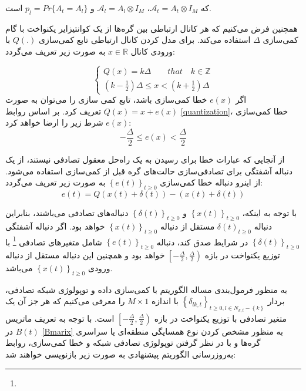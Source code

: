 که $\mathcal{A}_t=A_t\otimes I_M$، $\mathcal{A}_l=A_l\otimes I_M$ و  $p_l=Pr\{A_t=A_l\}$ است. 

همچنین فرض می‌کنیم که هر کانال ارتباطی بین گره‌ها از یک کوانتیزایر یکنواخت با گام کمی‌سازی $\Delta$ استفاده می‌کند. برای مدل کردن کانال ارتباطی تابع کمی‌سازی $Q(.)$ با ورودی کانال $x\in \mathbb{R}$ به صورت زیر تعریف می‌گردد:

\begin{equation}\label{quantization}
	\begin{cases}
		Q(x)=k\Delta\qquad that \quad k\in\mathbb{Z}\\
		(k-\frac{1}{2})\Delta\le x<	(k+\frac{1}{2})\Delta
	\end{cases}
\end{equation}
اگر $e(x)$ خطا کمی‌سازی باشد، تابع کمی سازی را می‌توان به صورت $Q(x)=x+e(x)$ تعریف کرد. بر اساس روابط \ref{quantization}، خطا کمی‌سازی $e(x)$ شرط زیر را ارضا خواهد کرد:
\begin{equation}
	-\frac{\Delta}{2}\le e(x)<\frac{\Delta}{2}
\end{equation}

از آنجایی که عبارات خطا برای رسیدن به یک راه‌حل معقول تصادفی نیستند، از یک دنباله آشفتگی برای تصادفی‌سازی حالت‌های گره قبل از کمی‌سازی استفاده می‌شود. از اینرو دنباله خطا کمی‌سازی $\left\{e(t)\right\}_{t\ge 0}$ به صورت زیر تعریف می‌گردد:
\begin{equation}
	e(t)=Q(x(t)+\delta(t))-(x(t)+\delta(t))
\end{equation}

با توجه به اینکه، $\left\{x(t)\right\}_{t\ge 0}$ و $\left\{\delta(t)\right\}_{t\ge 0}$ دنباله‌های تصادفی می‌باشند، بنابراین دنباله ${\delta(t)}_{t\ge 0}$ مستقل از دنباله $\left\{x(t)\right\}_{t\ge 0}$ خواهد بود. اگر دنباله آشفتگی $\left\{\delta(t)\right\}_{t\ge 0}$ در شرایط  \cite{SchuchmanCondition} صدق کند، دنباله $\left\{e(t)\right\}_{t\ge 0}$ شامل متغیرهای تصادفی  \footnote{} با توزیع یکنواخت در بازه
 $\left[-\frac{\Delta}{2},\frac{\Delta}{2}\right)$ خواهد بود و همچنین این دنباله مستقل از دنباله ورودی $\left\{x(t)\right\}_{t\ge 0}$ می‌باشد. 

به منظور فرمول‌بندی مساله الگوریتم  با کمی‌سازی داده و توپولوژی شبکه تصادفی، بردار $\left\{\delta_{lk,t}\right\}_{t\ge 0,l\in N_{k,t}{-}\left\{k\right\}}$ با اندازه $M\times 1$ را معرفی می‌کنیم که هر جز آن یک متغیر تصادفی  با توزیع یکنواخت در بازه $\left[-\frac{\Delta}{2},\frac{\Delta}{2}\right)$ است. با توجه به تعریف ماتریس $B(t)$ در \ref{Bmarix} به منظور مشخص کردن نوع همسایگی‌ منطقه‌ای یا سراسری گره‌ها و با در نظر گرفتن توپولوژی تصادفی شبکه و خطا کمی‌سازی، روابط به‌روزرسانی الگوریتم پیشنهادی به صورت زیر بازنویسی خواهند شد:

